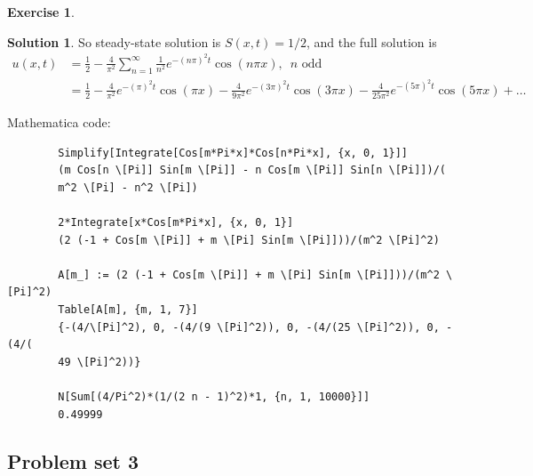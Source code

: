 \documentclass{article}
\theoremstyle{definition}
\newtheorem*{exer*}{Exercise}
\newtheorem*{sln*}{Solution}
\begin{document}
\begin{exer*}
\begin{sln*}
		So steady-state solution is $S(x,t) = 1/2$, and the full solution is
		\begin{align*}
		u(x,t) &= \frac{1}{2}-\frac{4}{\pi^2}\sum_{n=1}^\infty \frac{1}{n^2}e^{-(n\pi)^2 t}\cos(n\pi x),\,\,\, n \text{ odd}\\
		&= \frac{1}{2}-\frac{4}{\pi ^2}e^{-(\pi)^2 t}\cos(\pi x)    -\frac{4}{9 \pi ^2}e^{-(3\pi)^2 t}\cos(3\pi x)        -\frac{4}{25 \pi ^2}e^{-(5\pi)^2 t}\cos(5\pi x) + \dots
		\end{align*}
		
		\noindent Mathematica code:
		\begin{lstlisting}
		Simplify[Integrate[Cos[m*Pi*x]*Cos[n*Pi*x], {x, 0, 1}]]
		(m Cos[n \[Pi]] Sin[m \[Pi]] - n Cos[m \[Pi]] Sin[n \[Pi]])/(
		m^2 \[Pi] - n^2 \[Pi])
		
		2*Integrate[x*Cos[m*Pi*x], {x, 0, 1}]
		(2 (-1 + Cos[m \[Pi]] + m \[Pi] Sin[m \[Pi]]))/(m^2 \[Pi]^2)
		
		A[m_] := (2 (-1 + Cos[m \[Pi]] + m \[Pi] Sin[m \[Pi]]))/(m^2 \[Pi]^2)
		Table[A[m], {m, 1, 7}]
		{-(4/\[Pi]^2), 0, -(4/(9 \[Pi]^2)), 0, -(4/(25 \[Pi]^2)), 0, -(4/(
		49 \[Pi]^2))}
		
		N[Sum[(4/Pi^2)*(1/(2 n - 1)^2)*1, {n, 1, 10000}]]
		0.49999
		\end{lstlisting}
	\end{sln*}
\end{exer*}


\newpage
\subsection{Problem set 3}
\end{document}
